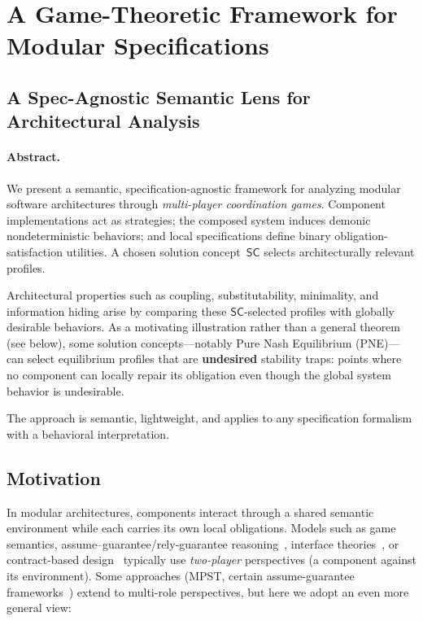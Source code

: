 \section{A Game-Theoretic Framework for Modular Specifications}
\label{sec:framework}

\subsection*{A Spec-Agnostic Semantic Lens for Architectural Analysis}

\paragraph{Abstract.}
We present a semantic, specification-agnostic framework for analyzing modular software architectures through \emph{multi-player coordination games}.
Component implementations act as strategies; the composed system induces demonic nondeterministic behaviors; and local specifications define binary obligation-satisfaction utilities.
A chosen solution concept~$\mathsf{SC}$ selects architecturally relevant profiles.

Architectural properties such as coupling, substitutability, minimality, and information hiding arise by comparing these $\mathsf{SC}$-selected profiles with globally desirable behaviors. As a motivating illustration rather than a general theorem (see  below), some solution concepts---notably Pure Nash Equilibrium (PNE)---can select equilibrium profiles that are \textbf{undesired} stability traps: points where no component can locally repair its obligation even though the global system behavior is undesirable.

The approach is semantic, lightweight, and applies to any specification formalism with a behavioral interpretation.

\subsection{Motivation}

In modular architectures, components interact through a shared semantic environment while each carries its own local obligations.
Models such as game semantics, assume--guarantee/rely-guarantee
reasoning~\cite{Jones1983RelyGuarantee,AbadiLamport1993ComposingSpecifications},
interface theories~\cite{deAlfaroHenzinger2001InterfaceAutomata}, or
contract-based design~\cite{Benveniste2018ContractsForSystemDesign} typically
use \emph{two-player} perspectives (a component against its environment).
Some approaches (MPST, certain assume-guarantee frameworks~\cite{ChiltonAssumeGuarantee}) extend to multi-role perspectives, but here we adopt an even more general view:


